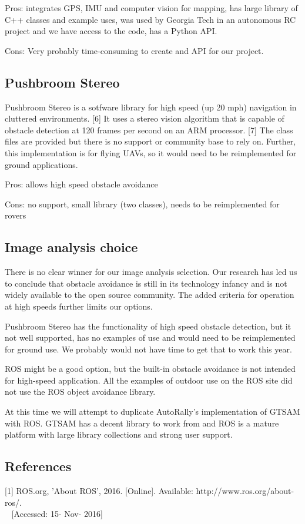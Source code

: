 \documentclass[compsoc,draftclsnofoot,onecolumn,10pt]{IEEEtran}
\begin{document}
Pros: integrates GPS, IMU and computer vision for mapping, has large library of
C++ classes and example uses, was used by Georgia Tech in an autonomous RC
project and we have access to the code, has a Python API.

Cons: Very probably time-consuming to create and API for our project.

\subsection{Pushbroom Stereo}
Pushbroom Stereo is a sotfware library for high speed (up 20 mph) navigation in
cluttered environments. [6] It uses a stereo vision algorithm that is capable of
obstacle detection at 120 frames per second on an ARM processor. [7] The class
files are provided but there is no support or community base to rely on.
Further, this implementation is for flying UAVs, so it would need to be
reimplemented for ground applications.

Pros: allows high speed obstacle avoidance

Cons: no support, small library (two classes), needs to be reimplemented for
rovers

\subsection{Image analysis choice}
There is no clear winner for our image analysis selection. Our research has led
us to conclude that obstacle avoidance is still in its technology infancy and is
not widely available to the open source community. The added criteria for
operation at high speeds further limits our options.\par
Pushbroom Stereo has the functionality of high speed obstacle detection, but it
not well supported, has no examples of use and would need to be reimplemented
for ground use. We probably would not have time to get that to work this
year.\par
ROS might be a good option, but the built-in obstacle avoidance is not intended for
high-speed application. All the examples of outdoor use on the ROS site did not
use the ROS object avoidance library.\par
At this time we will attempt to duplicate AutoRally's implementation
of GTSAM with ROS. GTSAM has a decent library to work from and ROS is a mature
platform with large library collections and strong user support. 

\subsection{References}
[1] ROS.org, 'About ROS', 2016. [Online]. Available: http://www.ros.org/about-ros/.\\~
[Accessed: 15- Nov- 2016]
\end{document}

